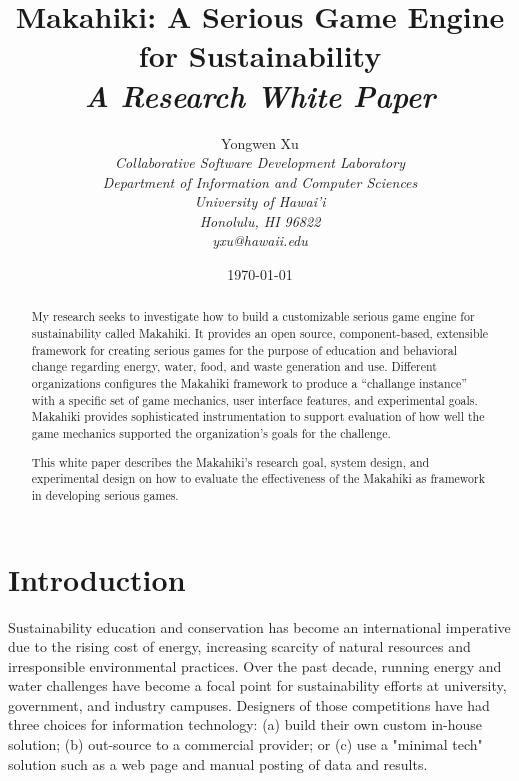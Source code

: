 \documentclass[11pt]{article}
\begin{document}
\title{Makahiki: A Serious Game Engine for Sustainability \\
\em  A Research White Paper}

\author{
	 Yongwen Xu \\
\em  Collaborative Software Development Laboratory \\
\em  Department of Information and Computer Sciences \\
\em  University of Hawai'i \\
\em  Honolulu, HI 96822 \\
     yxu@hawaii.edu \\
}

\date{\today}
\maketitle

\tableofcontents

\graphicspath{{figures/}} 

\newpage
\begin{abstract}

My research seeks to investigate how to build a customizable serious game engine for sustainability called Makahiki. It provides an open source, component-based, extensible framework for creating serious games for the purpose of education and behavioral change regarding energy, water, food, and waste generation and use. Different organizations configures the Makahiki framework to produce a ``challange instance'' with a specific set of game mechanics, user interface features, and experimental goals. Makahiki provides sophisticated instrumentation to support evaluation of how well the game mechanics supported the organization's goals for the challenge.

This white paper describes the Makahiki's research goal, system design, and experimental design on how to evaluate the effectiveness of the Makahiki as framework in developing serious games.
\end{abstract}


\section{Introduction}

Sustainability education and conservation has become an international imperative due to the rising cost of energy, increasing scarcity of natural resources and irresponsible environmental practices. 
Over the past decade, running energy and water challenges have become a focal point for sustainability efforts at university, government, and industry campuses. Designers of those competitions have had three choices for information technology: (a) build their own custom in-house solution; (b) out-source to a commercial provider; or (c) use a "minimal tech" solution such as a web page and manual posting of data and results.
\end{document}
